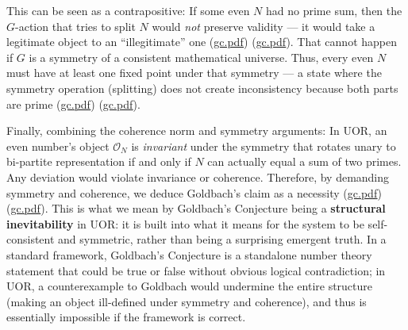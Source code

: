 \documentclass[12pt]{article}
\begin{document}
This can be seen as a contrapositive: If some even $N$ had no prime sum, then the $G$-action that tries to split $N$ would \emph{not} preserve validity --- it would take a legitimate object to an “illegitimate” one (\href{file://file-7ZYYwSHWVa83XEVTrEhg5z#:~:text=symmetry%20is%20a%20true%20automorphism,primes%20%24p%2Cq%24%20to%20back%20it}{gc.pdf}) (\href{file://file-7ZYYwSHWVa83XEVTrEhg5z#:~:text=%24N%24%20had%20no%20prime%20split%2C,contraposition%2C%20if%20the%20symmetry%20is}{gc.pdf}). That cannot happen if $G$ is a symmetry of a consistent mathematical universe. Thus, every even $N$ must have at least one fixed point under that symmetry --- a state where the symmetry operation (splitting) does not create inconsistency because both parts are prime (\href{file://file-7ZYYwSHWVa83XEVTrEhg5z#:~:text=exact%20invariance%20of%20the%20system,the%20action%20connecting%20unary%20to}{gc.pdf}) (\href{file://file-7ZYYwSHWVa83XEVTrEhg5z#:~:text=every%20even%20%24N%24%20must%20have,the%20action%20connecting%20unary%20to}{gc.pdf}).

Finally, combining the coherence norm and symmetry arguments: In UOR, an even number’s object $\mathcal{O}_N$ is \emph{invariant} under the symmetry that rotates unary to bi-partite representation if and only if $N$ can actually equal a sum of two primes. Any deviation would violate invariance or coherence. Therefore, by demanding symmetry and coherence, we deduce Goldbach’s claim as a necessity (\href{file://file-7ZYYwSHWVa83XEVTrEhg5z#:~:text=those%20where%20the%20parts%20are,the%20action%20connecting%20unary%20to}{gc.pdf}) (\href{file://file-7ZYYwSHWVa83XEVTrEhg5z#:~:text=prime,pair%20must%20exist}{gc.pdf}). This is what we mean by Goldbach’s Conjecture being a \textbf{structural inevitability} in UOR: it is built into what it means for the system to be self-consistent and symmetric, rather than being a surprising emergent truth. In a standard framework, Goldbach’s Conjecture is a standalone number theory statement that could be true or false without obvious logical contradiction; in UOR, a counterexample to Goldbach would undermine the entire structure (making an object ill-defined under symmetry and coherence), and thus is essentially impossible if the framework is correct.
\end{document}
